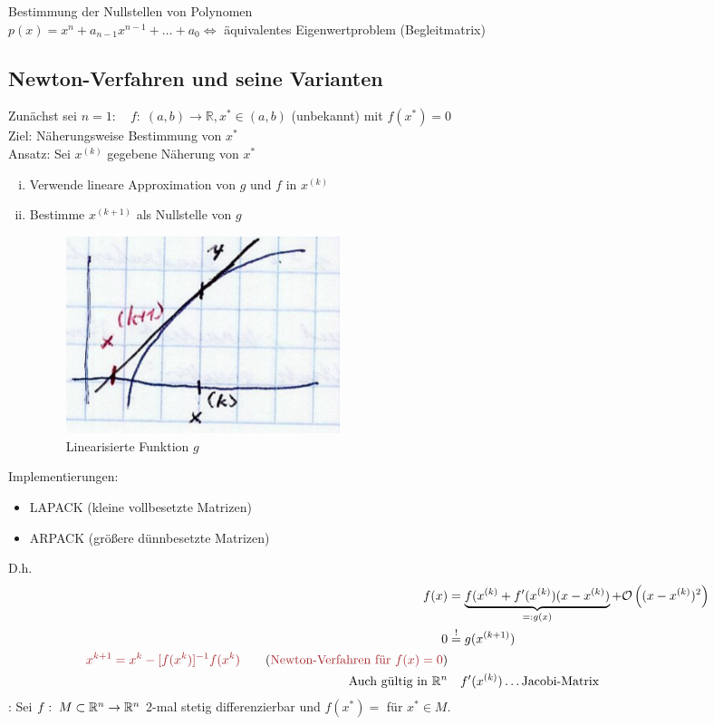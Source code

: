 Bestimmung der Nullstellen von Polynomen\\
$p(x) = x^n + a_{n-1}x^{n-1} + \ldots + a_0 \Leftrightarrow$ äquivalentes Eigenwertproblem (Begleitmatrix)

\subsection{Newton-Verfahren und seine Varianten}
Zunächst sei $n=1: \quad f:\;(a,b) \rightarrow \mathbb{R}, x^* \in (a,b)$ (unbekannt) mit $f(x^*) = 0$\\
Ziel: Näherungsweise Bestimmung von $x^*$\\
Ansatz: Sei $x^{(k)}$ gegebene Näherung von $x^*$
\begin{enumerate}[i)]
  \item Verwende lineare Approximation von $g$ und $f$ in $x^{(k)}$
  \item Bestimme $x^{(k+1)}$ als Nullstelle von $g$
  \begin{figure}[htbp]
    \centering
    \includegraphics[width=0.4\textwidth]{figures/naeherung_nst.png}
    \caption{Linearisierte Funktion $g$}
  \end{figure}
\end{enumerate}
Implementierungen:
\begin{itemize}
  \item LAPACK (kleine vollbesetzte Matrizen)
  \item ARPACK (größere dünnbesetzte Matrizen)
\end{itemize}
D.h.
\begin{align*}
  f(x) &= \underbrace{f(x^{(k)} + f'(x^{(k)})(x - x^{(k)})}_{=: g(x)} + \LandauO\left( (x - x^{(k)})^2 \right)\\
  0 &\mustbe g(x^{(k+1)})\\
  \mathbin{\textcolor{rot}{x^{k+1} = x^k - [f(x^k)]^{-1} f(x^k) }}\tag{\textcolor{rot}{Newton-Verfahren für $f(x)=0$}}\\
  \text{Auch gültig in } \rn &\quad f'(x^{(k)})\ldots\text{Jacobi-Matrix}
\end{align*}
\satz: Sei $f:\;M \subset \mathbb{R}^{n} \rightarrow \mathbb{R}^{n}$ 2-mal stetig differenzierbar und $f(x^*) = $ für $x^* \in M$.\\
